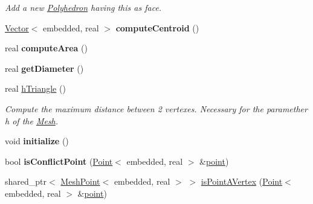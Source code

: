 \begin{DoxyCompactItemize}
\begin{DoxyCompactList}\small\item\em Add a new \hyperlink{class_polyhedron}{Polyhedron} having this as face. \end{DoxyCompactList}\item 
\hyperlink{class_point}{Vector}$<$ embedded, real $>$ {\bfseries compute\+Centroid} ()\hypertarget{class_polygon_a53555fe6109d8ddf75d432f157f021c7}{}\label{class_polygon_a53555fe6109d8ddf75d432f157f021c7}

\item 
real {\bfseries compute\+Area} ()\hypertarget{class_polygon_af53fc15da94e704d6aab016171f6c15f}{}\label{class_polygon_af53fc15da94e704d6aab016171f6c15f}

\item 
real {\bfseries get\+Diameter} ()\hypertarget{class_polygon_a3b375cd2abd0f7535041b17d7d7b4f14}{}\label{class_polygon_a3b375cd2abd0f7535041b17d7d7b4f14}

\item 
real \hyperlink{class_polygon_a96f0c55cdb99e0cfc87ecf4d855c91d3}{h\+Triangle} ()\hypertarget{class_polygon_a96f0c55cdb99e0cfc87ecf4d855c91d3}{}\label{class_polygon_a96f0c55cdb99e0cfc87ecf4d855c91d3}

\begin{DoxyCompactList}\small\item\em Compute the maximum distance between 2 vertexes. Necessary for the paramether h of the \hyperlink{class_mesh}{Mesh}. \end{DoxyCompactList}\item 
void {\bfseries initialize} ()\hypertarget{class_polygon_a3d0aa945fd528d2c6ee44838f9eaad6f}{}\label{class_polygon_a3d0aa945fd528d2c6ee44838f9eaad6f}

\item 
bool {\bfseries is\+Conflict\+Point} (\hyperlink{class_point}{Point}$<$ embedded, real $>$ \&\hyperlink{class_polygon_a56f83109c9c8ad214f41bd8036efb32c}{point})\hypertarget{class_polygon_a4df44a07db58dba116ae2362fb08e9aa}{}\label{class_polygon_a4df44a07db58dba116ae2362fb08e9aa}

\item 
shared\+\_\+ptr$<$ \hyperlink{class_mesh_point}{Mesh\+Point}$<$ embedded, real $>$ $>$ \hyperlink{class_polygon_a10ed15053764f6170fee5b4f06a76174}{is\+Point\+A\+Vertex} (\hyperlink{class_point}{Point}$<$ embedded, real $>$ \&\hyperlink{class_polygon_a56f83109c9c8ad214f41bd8036efb32c}{point})\hypertarget{class_polygon_a10ed15053764f6170fee5b4f06a76174}{}\label{class_polygon_a10ed15053764f6170fee5b4f06a76174}


\end{DoxyCompactItemize}
